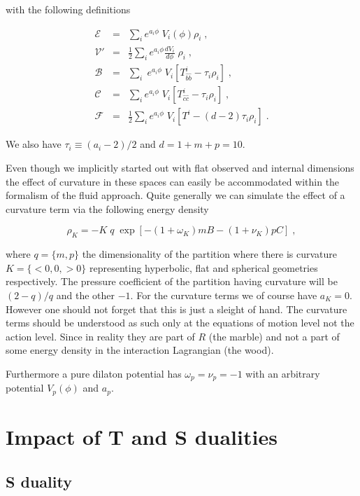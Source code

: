 \documentclass[aps,floatfix,twocolumn,amsmath]{revtex4}
\newcommand{\be}{\begin{equation}}
\newcommand{\ee}{\end{equation}}
\newcommand{\bea}{\begin{eqnarray}}
\newcommand{\eea}{\end{eqnarray}}
\begin{document}
\noindent with the following definitions

\begin{subequations}
\bea
\mathcal{E}&=&\sum_{i}e^{a_{i}\phi}\;V_{i}(\phi)\rho_{i}\;,\\
\mathcal{V'}&=&\frac{1}{2}\sum_{i}e^{a_{i}\phi}\frac{dV_{i}}{d\phi}\;\rho_{i}\;,\\
\mathcal{B}&=&\sum_{i}\;e^{a_{i}\phi}\;V_{i}\left[T^{i}_{\hat{b}\hat{b}}-\tau_{i}\rho_{i}\right]\;,\\
\mathcal{C}&=&\sum_{i}e^{a_{i}\phi}\;V_{i}\left[T^{i}_{\hat{c}\hat{c}}-\tau_{i}\rho_{i}\right]\;,\\
\mathcal{F}&=&\frac{1}{2}\sum_{i}e^{a_{i}\phi}\;V_{i}\left[T^{i}-(d-2)\tau_{i}\rho_{i}\right]\;.
\eea
\end{subequations}

\noindent We also have $\tau_{i}\equiv(a_{i}-2)/2$ and $d=1+m+p=10$.

Even though we implicitly started out with flat observed and internal dimensions the effect of curvature in these spaces can easily be accommodated within the formalism of the fluid approach. Quite generally we can simulate the effect of a curvature term via the following energy density

\be
\rho_{K}=-K\;q\;\exp\left[-(1+\omega_{K})mB-(1+\nu_{K})pC\right]\;,
\ee

\noindent where $q=\lbrace m,p\rbrace$ the dimensionality of the partition where there is curvature $K=\lbrace <0,0,>0 \rbrace$ representing hyperbolic, flat and spherical geometries respectively. The pressure coefficient of the partition having curvature will be $(2-q)/q$ and the other $-1$. For the curvature terms we of course have $a_{K}=0$. However one should not forget that this is just a sleight of hand. The curvature terms should be understood as such only at the equations of motion level not the action level. Since in reality they are part of $R$ (the marble) and not a part of some energy density in the interaction Lagrangian (the wood).

Furthermore a pure dilaton potential has $\omega_{p}=\nu_{p}=-1$ with an arbitrary potential $V_{p}(\phi)$ and $a_{p}$.

\section{Impact of T and S dualities}

\subsection{S duality}
\end{document}
